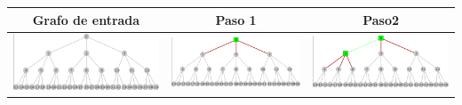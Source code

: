 
	\begin{center}
		\begin{tabular}{ |c||c||c| }
			\hline
			Grafo de entrada & Paso 1 & Paso2 \\
			\hline\hline
			\includegraphics[scale = 0.15]{img/ej3/constructiva_golosa/ctree_st0.png} &
			\includegraphics[scale = 0.15]{img/ej3/constructiva_golosa/ctree_st1.png} &
			\includegraphics[scale = 0.15]{img/ej3/constructiva_golosa/ctree_st2.png} \\

\end{tabular}
\end{center}
